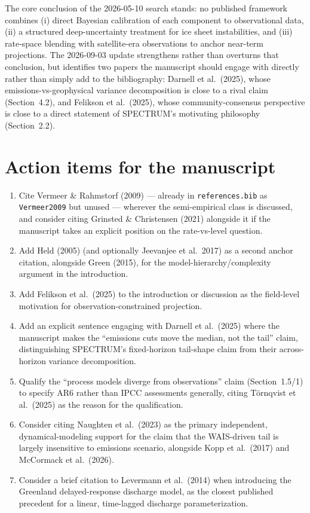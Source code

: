\documentclass[11pt]{article}
\begin{document}
\noindent The core conclusion of the 2026-05-10 search stands: no published
framework combines (i) direct Bayesian calibration of each component to
observational data, (ii) a structured deep-uncertainty treatment for ice
sheet instabilities, and (iii) rate-space blending with satellite-era
observations to anchor near-term projections. The 2026-09-03 update
strengthens rather than overturns that conclusion, but identifies two
papers the manuscript should engage with directly rather than simply add to
the bibliography: Darnell et al.\ (2025), whose emissions-vs-geophysical
variance decomposition is close to a rival claim (Section~4.2), and
Felikson et al.\ (2025), whose community-consensus perspective is close to
a direct statement of SPECTRUM's motivating philosophy (Section~2.2).

\section{Action items for the manuscript}

\begin{enumerate}[leftmargin=*]
\item Cite Vermeer \& Rahmstorf (2009) --- already in \texttt{references.bib}
as \texttt{Vermeer2009} but unused --- wherever the semi-empirical class is
discussed, and consider citing Grinsted \& Christensen (2021) alongside it
if the manuscript takes an explicit position on the rate-vs-level question.
\item Add Held (2005) (and optionally Jeevanjee et al.\ 2017) as a second
anchor citation, alongside Green (2015), for the model-hierarchy/complexity
argument in the introduction.
\item Add Felikson et al.\ (2025) to the introduction or discussion as the
field-level motivation for observation-constrained projection.
\item Add an explicit sentence engaging with Darnell et al.\ (2025) where
the manuscript makes the ``emissions cuts move the median, not the tail''
claim, distinguishing SPECTRUM's fixed-horizon tail-shape claim from their
across-horizon variance decomposition.
\item Qualify the ``process models diverge from observations'' claim
(Section~1.5/1) to specify AR6 rather than IPCC assessments generally,
citing Törnqvist et al.\ (2025) as the reason for the qualification.
\item Consider citing Naughten et al.\ (2023) as the primary independent,
dynamical-modeling support for the claim that the WAIS-driven tail is
largely insensitive to emissions scenario, alongside Kopp et al.\ (2017)
and McCormack et al.\ (2026).
\item Consider a brief citation to Levermann et al.\ (2014) when introducing
the Greenland delayed-response discharge model, as the closest published
precedent for a linear, time-lagged discharge parameterization.
\end{enumerate}
\end{document}
